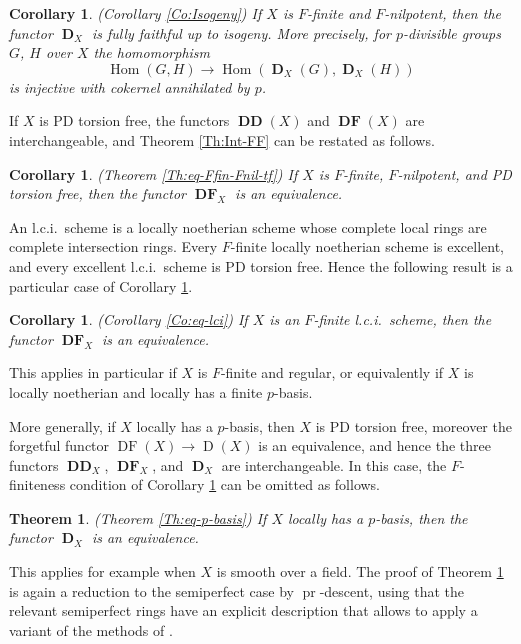 \documentclass[a4paper,11pt]{article}
\theoremstyle{plain}
\newtheorem{Thm}[Lemma]{Theorem}
\newtheorem{Cor}[Lemma]{Corollary}
\theoremstyle{definition}
\theoremstyle{remark}
\theoremstyle{definition}
\numberwithin{Lemma}{section}
\numberwithin{Subpoint}{Lemma}
\numberwithin{equation}{section}
\newcommand{\DD}{{\mathbb{D}}}
\newcommand{\FF}{{\mathbb{F}}}
\DeclareMathOperator{\Dcat}{D}
\DeclareMathOperator{\Dfun}{\mathbf D} %
\DeclareMathOperator{\DDfun}{\mathbf {DD}} %
\DeclareMathOperator{\DFcat}{DF}
\DeclareMathOperator{\DFfun}{\mathbf{DF}} %
\DeclareMathOperator{\Hom}{Hom}
\newcommand{\nameoftop}{{\operatorname{pr}}}
\newcommand{\chang}[1]{{#1}}
\begin{document}
\begin{Cor}
\label{Co:Int-isog}
(Corollary \ref{Co:Isogeny})
\chang{If $X$ is $F$-finite and $F$-nilpotent,
then the functor\/ $\Dfun_X$ is fully faithful up to isogeny.
More precisely, for $p$-divisible groups $G$, $H$ over $X$
the homomorphism}
\[
\Hom(G,H)\to\Hom(\Dfun_X(G),\Dfun_X(H))
\]
is injective with cokernel annihilated by $p$.
\end{Cor}

\chang{If $X$ is PD torsion free, the functors $\DDfun(X)$ and $\DFfun(X)$ are interchangeable, and Theorem \ref{Th:Int-FF} can be restated as follows.}

\begin{Cor}
\label{Co:Int-FFT}
(Theorem \ref{Th:eq-Ffin-Fnil-tf})
If $X$ is $F$-finite, $F$-nilpotent, and PD torsion free,
then the functor $\DFfun_X$ is an equivalence.
\end{Cor}

An l.c.i.\ scheme is a locally noetherian scheme whose
complete local rings are complete intersection rings.
\chang{Every} $F$-finite locally noetherian scheme is excellent,
and \chang{every} excellent l.c.i.\ scheme is PD torsion free.
\chang{Hence the following result is a particular case of Corollary \ref{Co:Int-FFT}.}

\begin{Cor}
\label{Co:Int-lci}
(Corollary \ref{Co:eq-lci})
If $X$ is an $F$-finite l.c.i.\ scheme, 
then the functor $\DFfun_X$ is an equivalence.
\end{Cor}

\chang{This applies in particular if $X$ is $F$-finite and regular,
or equivalently if $X$ is locally noetherian and locally has a finite $p$-basis.

More generally, if $X$ locally has a $p$-basis, then $X$ is PD torsion free, moreover the forgetful functor $\DFcat(X)\to\Dcat(X)$ is an equivalence, and hence the three functors $\DDfun_X$, $\DFfun_X$, and $\Dfun_X$ are interchangeable. In this case, the $F$-finiteness condition of Corollary \ref{Co:Int-FFT} can be omitted as follows.}

\begin{Thm}
\label{Th:Int-pbasis}
(Theorem \ref{Th:eq-p-basis})
If $X$ locally has a $p$-basis, then the 
functor $\Dfun_X$ is an equivalence.
\end{Thm}

This applies for example when $X$ is smooth over a field.
\chang{The proof of Theorem \ref{Th:Int-pbasis}
is again a reduction to the semiperfect case by
$\nameoftop$-descent, using that the relevant semiperfect rings
have an explicit description that allows to apply
a variant of the methods of \cite{Lau:Semiperfect}.}
\end{document}
